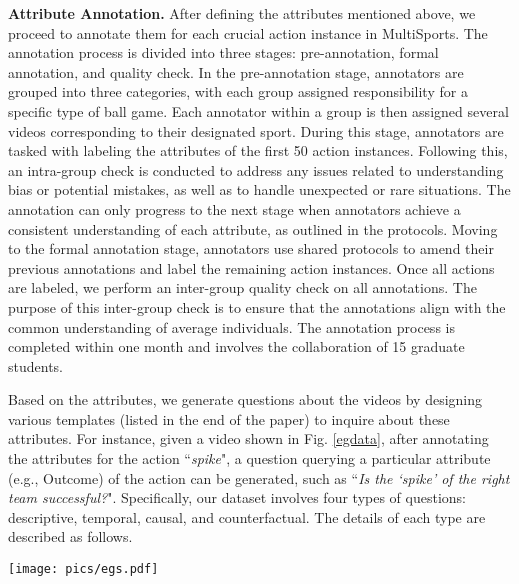 {\noindent\textbf{Attribute Annotation.}
After defining the attributes mentioned above, we proceed to annotate them for each crucial action instance in MultiSports. The annotation process is divided into three stages: pre-annotation, formal annotation, and quality check.
In the pre-annotation stage, annotators are grouped into three categories, with each group assigned responsibility for a specific type of ball game. Each annotator within a group is then assigned several videos corresponding to their designated sport. During this stage, annotators are tasked with labeling the attributes of the first 50 action instances. Following this, an intra-group check is conducted to address any issues related to understanding bias or potential mistakes, as well as to handle unexpected or rare situations. The annotation can only progress to the next stage when annotators achieve a consistent understanding of each attribute, as outlined in the protocols.
Moving to the formal annotation stage, annotators use shared protocols to amend their previous annotations and label the remaining action instances. Once all actions are labeled, we perform an inter-group quality check on all annotations. The purpose of this inter-group check is to ensure that the annotations align with the common understanding of average individuals.
The annotation process is completed within one month and involves the collaboration of 15 graduate students.


Based on the attributes, we generate questions about the videos by designing various templates (listed in the end of the paper) to inquire about these attributes. For instance, given a video shown in Fig. \ref{egdata}, after annotating the attributes for the action ``\textit{spike}", a question querying a particular attribute (e.g., Outcome) of the action can be generated, such as ``\textit{Is the `spike' of the right team successful?}".
Specifically, our dataset involves four types of questions: descriptive, temporal, causal, and counterfactual. The details of each type are described as follows.

\begin{figure*}[tbp]
\centering
\texttt{[image: pics/egs.pdf]}
\caption{Example of Sports-QA: The actions in the green boxes (such as ``\textit{2-point shot}") are the query actions, while the actions in the yellow boxes (such as ``\textit{block}") represent the effects. For ball games, annotators provide attribute labels, and we generate QA pairs based on these attributes. In gymnastics, we generate QA pairs using annotations from MultiSports/FineGym.
}
\label{egdata}
\end{figure*}



}
